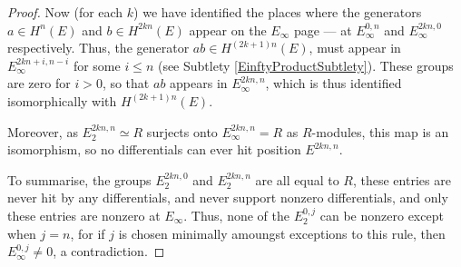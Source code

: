 \begin{proof}
Now (for each $k$) we have identified the places where the generators $a\in H^n(E)$ and $b\in H^{2kn}(E)$ appear on the $E_{\infty}$ page --- at $E_\infty^{0,n}$ and $E_\infty^{2kn,0}$ respectively. Thus, the generator $ab\in H^{(2k+1)n}(E)$, must appear in $E_{\infty}^{2kn+i,n-i}$ for some $i\leq n$ (see Subtlety \ref{EinftyProductSubtlety}).
These groups are zero for $i>0$, so that $ab$ appears in $E_{\infty}^{2kn,n}$, which is thus identified isomorphically with $H^{(2k+1)n}(E)$.

Moreover, as $E_2^{2kn,n}\simeq R$ surjects onto $E_\infty^{2kn,n}=R$ as $R$-modules, this map is an isomorphism, so no differentials can ever hit position $E^{2kn,n}$.

%

To summarise, the groups $E_2^{2kn,0}$ and $E_2^{2kn,n}$ are all equal to $R$, these entries are never hit by any differentials, and never support nonzero differentials, and only these entries are nonzero at $E_\infty$. Thus, none of the $E_2^{0,j}$ can be nonzero except when $j=n$, for if $j$ is chosen minimally amoungst exceptions to this rule, then $E_\infty^{0,j}\neq0$, a contradiction.
%
%
%
\end{proof}
